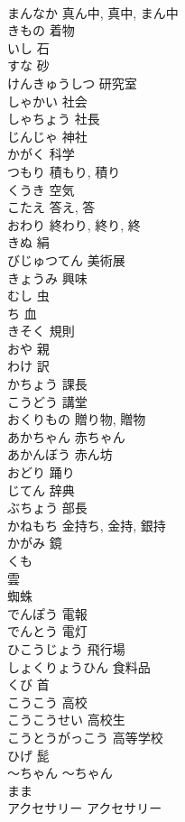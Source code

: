 \documentclass[8pt]{extreport}
\begin{document}
\begin{CJK}{UTF8}{min}
\\	まんなか	真ん中, 真中, まん中
\\	きもの	着物
\\	いし	石
\\	すな	砂
\\	けんきゅうしつ	研究室
\\	しゃかい	社会
\\	しゃちょう	社長
\\	じんじゃ	神社
\\	かがく	科学
\\	つもり	積もり, 積り
\\	くうき	空気
\\	こたえ	答え, 答
\\	おわり	終わり, 終り, 終
\\	きぬ	絹
\\	びじゅつてん	美術展
\\	きょうみ	興味
\\	むし	虫
\\	ち	血
\\	きそく	規則
\\	おや	親
\\	わけ	訳
\\	かちょう	課長
\\	こうどう	講堂
\\	おくりもの	贈り物, 贈物
\\	あかちゃん	赤ちゃん
\\	あかんぼう	赤ん坊
\\	おどり	踊り
\\	じてん	辞典
\\	ぶちょう	部長
\\	かねもち	金持ち, 金持, 銀持
\\	かがみ	鏡
\\	くも	
\\	雲 
\\	蜘蛛
\\	でんぽう	電報
\\	でんとう	電灯
\\	ひこうじょう	飛行場
\\	しょくりょうひん	食料品
\\	くび	首
\\	こうこう	高校
\\	こうこうせい	高校生
\\	こうとうがっこう	高等学校
\\	ひげ	髭
\\	～ちゃん	～ちゃん
\\	まま	
\\	アクセサリー	アクセサリー

\end{CJK}
\end{document}

